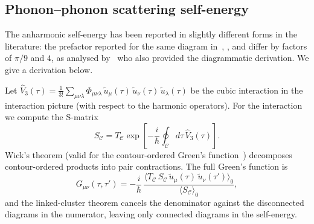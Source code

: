 \subsection{Phonon--phonon scattering self-energy}
\label{sub:phph_se}

The anharmonic self-energy has been reported in slightly different forms in the
literature: the prefactor reported for the same diagram in~\citet{wang_nonequilibrium_2007,wang_quantum_2008},
\citet{mingo_anharmonic_2006}, and \citet{luisier_atomistic_2012} differ by
factors of $\pi/9$ and $4$, as analysed by~\citet{guo_quantum_2020}
who also provided the diagrammatic derivation.
We give a derivation below.

Let $\hat{V}_3(\tau) = \tfrac{1}{3!}\sum_{\mu\nu\lambda}
\Phi_{\mu\nu\lambda}\,\tilde{u}_\mu(\tau)\,\tilde{u}_\nu(\tau)\,\tilde{u}_\lambda(\tau)$
be the cubic interaction in the interaction picture (with respect to the harmonic operators). For the interaction
we compute the S-matrix~\cite{rammer_quantum_1986,haug_quantum_2008}
\begin{equation}\label{eq:S_matrix}
  S_{\mathcal{C}} = T_{\mathcal{C}}\exp\!\left[-\frac{i}{\hbar}\oint_{\mathcal{C}}d\tau\,\hat{V}_3(\tau)\right].
\end{equation}
Wick's theorem (valid for the contour-ordered Green's function~\cite{wang_quantum_2008}) decomposes contour-ordered
products into pair contractions. The full Green's function is
\begin{equation}\label{eq:G_full}
  G_{\mu\nu}(\tau,\tau')
  = -\frac{i}{\hbar}\,\frac{
       \langle T_{\mathcal{C}}\,
       S_{\mathcal{C}}\,
       \tilde{u}_\mu(\tau)\,
       \tilde{u}_\nu(\tau')\rangle_0}
      {\langle S_{\mathcal{C}}\rangle_0},
\end{equation}
and the linked-cluster theorem cancels the denominator against the
disconnected diagrams in the numerator, leaving only connected diagrams
in the self-energy.

